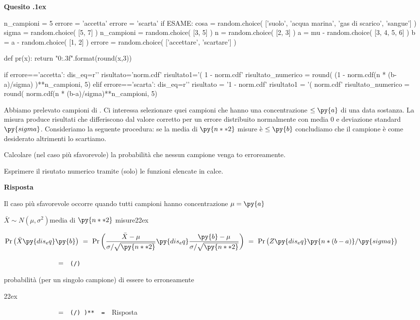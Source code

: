 \documentclass[11pt,twoside,a4paper]{article}
\def\Pr{{\rm Pr\,}}
\newcounter{quesito}
\newenvironment{question}{\addtocounter{quesito}{1}\bigskip\bigskip\par\textbf{Quesito \thequesito.\kern1ex}}{\vspace{\parskip}}
\newenvironment{answer}{\par\textbf{Risposta\quad}}{\vspace{\parskip}}
\begin{document}
\begin{question} %
\begin{pycode}
n_campioni = 5
errore = 'accetta'
errore = 'scarta'
if ESAME:
    cosa = random.choice( ['suolo', 'acqua marina', 'gas di scarico', 'sangue'] )
    sigma = random.choice( [5, 7] )
    n_campioni = random.choice( [3, 5] )
    n = random.choice( [2, 3] )
    a = mu - random.choice( [3, 4, 5, 6] )
    b = a - random.choice( [1, 2] )
    errore =  random.choice( ['accettare', 'scartare'] )

def pr(x):
    return "{0:.3f}".format(round(x,3))

if errore=='accetta':
    dis_eq=r'\le'
    risultato='norm.cdf'
    risultato1='( 1 - norm.cdf'
    risultato_numerico = round( (1 -  norm.cdf(n * (b-a)/sigma) )**n_campioni, 5)
elif errore=='scarta':
    dis_eq=r'\ge'
    risultato = '1 - norm.cdf'
    risultato1 = '( norm.cdf'
    risultato_numerico = round( norm.cdf(n * (b-a)/sigma)**n_campioni, 5)
\end{pycode}
Abbiamo prelevato  campioni di . Ci interessa selezionare quei campioni che hanno una concentrazione $\le\py{a}$ di una data sostanza. La misura produce risultati che differiscono dal valore corretto per un errore distribuito normalmente con media $0$ e deviazione standard $\py{sigma}$. Consideriamo la seguente procedura: se la media di $\py{n**2}$ misure è $\le\py{b}$ concludiamo che il campione è come desiderato altrimenti lo scartiamo.

Calcolare (nel caso più sfavorevole) la probabilità che nessun campione venga to erroreamente.

Esprimere il risutato numerico tramite (solo) le funzioni elencate in calce.
\begin{answer}

Il caso più sfavorevole occorre quando tutti  campioni hanno concentrazione $\mu=\py{a}$ 


$\bar X\sim N(\mu,\sigma^2)$\hfill media di $\py{n**2}$ misure\kern22ex

$\Pr\big(\bar X\py{dis_eq}\py{b}\big)\ =\ \Pr\bigg(\dfrac{\bar X-\mu}{\sigma/\sqrt{\py{n**2}}}\py{dis_eq}\dfrac{\py{b}-\mu}{\sigma/\sqrt{\py{n**2}}}\bigg)\ =\  \Pr\big(Z\py{dis_eq}\py{n * (b-a) } /\py{sigma} \big)$\medskip

$\phantom{\Pr\big(\bar X\le\py{b}\big)}\ =\ ${\tt\ (/)}\hfill\parbox[t]{43ex}{ probabilità (per un singolo campione) di essere to erroneamente}\kern22ex\medskip

$\phantom{\Pr\big(\bar X\le\py{b}\big)}\ =\ ${\color{blue}\tt\ (/) )** }{\tt\ =\  }\hfill {\color{blue}Risposta}

\end{answer}
\end{question}
\end{document}
